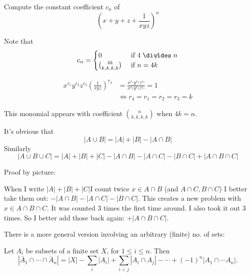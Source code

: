 \documentclass[twoside]{scrartcl}
\begin{document}
\begin{example}
Compute the constant coefficient $c_n$ of 
\[\left(x + y + z + \frac{1}{xyz}\right)^n\]	

Note that 
\[c_n = \begin{cases}
 0 & \text{ if } 4 \centernot\divides n\\
 \binom{4k}{k,k,k,k} &\text{ if } n = 4k	
 \end{cases}
\]

\[
\begin{aligned}
  x^{r_1}y^{r_2}z^{r_3} \left(\frac{1}{xyz}\right)^{r_4} &= \frac{  x^{r_1}y^{r_2}z^{r_3} }{x^{r_4}y^{r_4}z^{r_4}} = 1\\
  &\iff r_4 = r_1 = r_2 = r_3 = k
\end{aligned}
\]

This monomial appears with coefficient $\binom{n}{k,k,k,k}$ when $4k =n $. 
\end{example}


It's obvious that  
\[|A \cup B| = |A| + |B| -|A\cap B|\]
Similarly 
\[|A\cup B\cup C| = |A| + |B| + |C| - |A\cap B| - |A\cap C| - |B\cap C| + |A\cap B\cap C|\]

Proof by picture: 


\begin{center}
\end{center}


When I write $|A| + |B| + |C|$I count twice $x \in A\cap B$ (and $A\cap C, B \cap C$) I better take them out: $- |A \cap B|- |A \cap C| - |B\cap C|$. 
This creates a new problem with $x \in A \cap B \cap C$. It was counted $3$ times the first time around. I also took it out $3$ times. So I better add those back again: $+|A \cap B\cap C|$.

There is a more general version involving an arbitrary (finite) no. of sets:

\begin{theorem}
  Let $A_i$ be subsets of a finite set $X$, for $1 \leq i\leq n$. Then
  \[
    |\bar A_1\cap \cdots \cap \bar A_n| = |X| - \sum_i |A_i| + \sum_{i < j}|A_i\cap A_j| -  \cdots + (-1)^n|A_1\cap \cdots A_n|.
  \]
\end{theorem}\vspace*{10pt}
\end{document}
